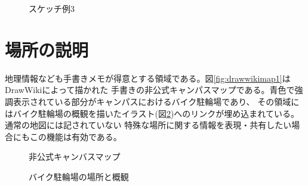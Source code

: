 \begin{figure}[H]
\begin{minipage}{0.5\hsize}
\begin{center}
                   \end{center} \caption{スケッチ例3} \label{fig:ideasketch4}
\end{minipage}
\end{figure}


\section{場所の説明}
\label{drawiki:map}
地理情報なども手書きメモが得意とする領域である。図\ref{fig:drawwikimap1}はDrawWikiによって描かれた
手書きの非公式キャンパスマップである。青色で強調表示されている部分がキャンパスにおけるバイク駐輪場であり、
その領域にはバイク駐輪場の概観を描いたイラスト(図\ref{fig:drawwikimap2})へのリンクが埋め込まれている。通常の地図には記されていない
特殊な場所に関する情報を表現・共有したい場合にもこの機能は有効である。

\begin{figure}[H] \begin{minipage}{0.5\hsize}
                      \begin{center} 
                      \end{center} \caption{非公式キャンバスマップ} \label{fig:drawwikimap1}
\end{minipage} \begin{minipage}{0.5\hsize}
                   \begin{center} 
                   \end{center} \caption{バイク駐輪場の場所と概観} \label{fig:drawwikimap2}
\end{minipage}
\end{figure}



